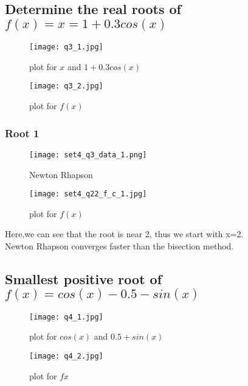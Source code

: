 \documentclass[a4paper]{article}
\begin{document}
        
           \subsection{Determine the real roots of $f(x) = x=1+ 0.3cos(x)$}
            \begin{figure}[!htbp]
              \centering
              \begin{minipage}[b]{0.45\textwidth}
                \texttt{[image: q3\_1.jpg]}
                \caption{plot for $x$ and $1+0.3cos(x)$ }
              \end{minipage}
              \hfill
              \begin{minipage}[b]{0.45\textwidth}
                \texttt{[image: q3\_2.jpg]}
                \caption{plot for $f(x)$}
              \end{minipage}
            \end{figure}
        \subsubsection{Root 1}
            \begin{figure}[!htbp]
              \centering
              \begin{minipage}[b]{0.45\textwidth}
\texttt{[image: set4\_q3\_data\_1.png]}
                \caption{Newton Rhapson }
              \end{minipage}
              \hfill
              \begin{minipage}[b]{0.45\textwidth}
                \texttt{[image: set4\_q22\_f\_c\_1.jpg]}
                \caption{plot for $f(x)$}
              \end{minipage}
            \end{figure}
            \Large{Here,we can see that the root is near 2, thus we start with x=2.\\Newton Rhapson converges faster than the bisection method.}
        \newpage
        
        \subsection{Smallest positive root of $f(x) = cos(x)- 0.5 -sin(x)$ }
            \begin{figure}[!htbp]
              \centering
              \begin{minipage}[b]{0.45\textwidth}
                \texttt{[image: q4\_1.jpg]}
                \caption{plot for $cos(x)$ and $0.5+sin(x)$ }
              \end{minipage}
              \hfill
              \begin{minipage}[b]{0.45\textwidth}
                \texttt{[image: q4\_2.jpg]}
                \caption{plot for $f{x}$ }
              \end{minipage}
            \end{figure}
\end{document}
